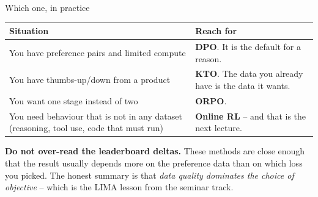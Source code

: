 \documentclass[aspectratio=169]{beamer}
\begin{document}
\begin{frame}{Which one, in practice}
  \small
  \begin{center}
  \footnotesize
  \begin{tabular}{p{5.6cm} p{6.6cm}}
    \toprule
    \textbf{Situation} & \textbf{Reach for} \\
    \midrule
    You have preference pairs and limited compute & \textbf{DPO}. It is the default for a reason. \\[3pt]
    You have thumbs-up/down from a product & \textbf{KTO}. The data you already have is the
      data it wants. \\[3pt]
    You want one stage instead of two & \textbf{ORPO}. \\[3pt]
    You need behaviour that is not in any dataset (reasoning, tool use, code that must run) &
      \textbf{Online RL} -- and that is the next lecture. \\
    \bottomrule
  \end{tabular}
  \end{center}

  \vskip 8pt
  \begin{tcolorbox}[colback=armorange!12, colframe=armorange, boxrule=0.6pt, arc=2pt]
    \small
    \textbf{Do not over-read the leaderboard deltas.} These methods are close enough that the
    result usually depends more on the preference data than on which loss you picked. The
    honest summary is that \emph{data quality dominates the choice of objective} -- which is the
    LIMA lesson from the seminar track.
  \end{tcolorbox}
\end{frame}
\end{document}
